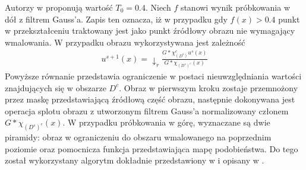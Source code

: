 \documentclass[12pt, twoside, openany]{report}
\theoremstyle{definition}
\begin{document}
Autorzy w \cite{arias2011variational} proponują wartość $T_0=0.4$. Niech $f$ stanowi wynik próbkowania w dół z filtrem Gauss'a. Zapis ten oznacza, iż w przypadku gdy $f(x)>0.4$ punkt w przekształceniu traktowany jest jako punkt źródłowy obrazu nie wymagający wmalowania. W przypadku obrazu wykorzystywana jest zależność
\begin{align}
u^{s+1}(x)= \downarrow_r \frac{G \ast \chi_{(D^s)}^c u^s(x)}{G \ast \chi_{{(D^s)}^c}(x)}
\end{align}
Powyższe równanie przedstawia ograniczenie w postaci nieuwzględniania wartości znajdujących się w obszarze $D^c$. Obraz w pierwszym kroku zostaje przemnożony przez maskę przedstawiającą źródłową część obrazu, następnie dokonywana jest operacja splotu obrazu z utworzonym filtrem Gauss'a normalizowany członem $G \ast \chi_{(D^s)^c}(x)$. W przypadku próbkowania w górę, wyznaczane są dwie piramidy: obraz w ograniczeniu do obszaru wmalowanego na poprzednim poziomie oraz pomocnicza funkcja przedstawiająca mapę podobieństwa. Do tego został wykorzystany algorytm dokładnie przedstawiony w \cite{wexler2007space} i opisany w \cite{arias2011variational}.
\end{document}

